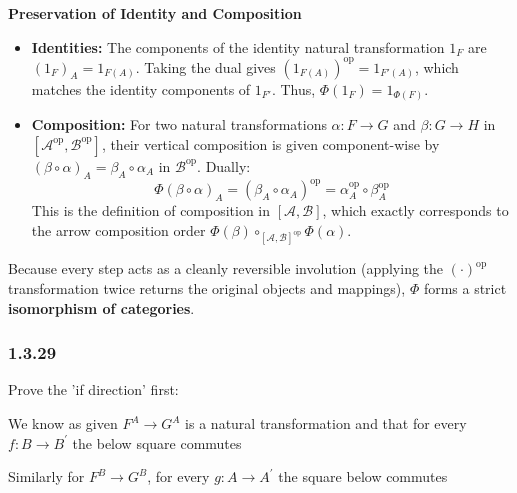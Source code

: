 \documentclass{article}
\begin{document}
\textbf{Preservation of Identity and Composition}
\begin{itemize}
    \item \textbf{Identities:} The components of the identity natural transformation $1_F$ are $(1_F)_A = 1_{F(A)}$. Taking the dual gives $(1_{F(A)})^\text{op} = 1_{F'(A)}$, which matches the identity components of $1_{F'}$. Thus, $\Phi(1_F) = 1_{\Phi(F)}$.
    
    \item \textbf{Composition:} For two natural transformations $\alpha: F \to G$ and $\beta: G \to H$ in $[\mathcal{A}^\text{op}, \mathcal{B}^\text{op}]$, their vertical composition is given component-wise by $(\beta \circ \alpha)_A = \beta_A \circ \alpha_A$ in $\mathcal{B}^\text{op}$. Dually:
    \[ \Phi(\beta \circ \alpha)_A = (\beta_A \circ \alpha_A)^\text{op} = \alpha_A^\text{op} \circ \beta_A^\text{op} \]
    This is the definition of composition in $[\mathcal{A}, \mathcal{B}]$, which exactly corresponds to the arrow composition order $\Phi(\beta) \circ_{[\mathcal{A}, \mathcal{B}]^\text{op}} \Phi(\alpha)$.
\end{itemize}

Because every step acts as a cleanly reversible involution (applying the $(\cdot)^\text{op}$ transformation twice returns the original objects and mappings), $\Phi$ forms a strict \textbf{isomorphism of categories}. 

\subsubsection*{1.3.29}

Prove the 'if direction' first:

We know as given $F^A \rightarrow G^A$ is a natural transformation and that for every $f\colon B \rightarrow B^{\prime}$ the below square commutes

\begin{center}
\end{center}

Similarly for $F^B \rightarrow G^B$, for every $g\colon A \rightarrow A^{\prime}$ the square below commutes

\begin{center}
\end{center}
\end{document}
